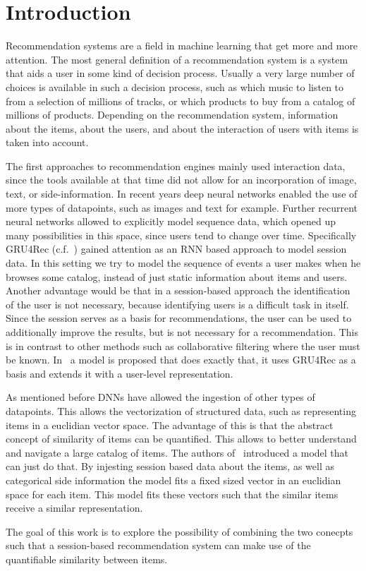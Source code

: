 \chapter{Introduction}
Recommendation systems are a field in machine learning that get more and more attention.
The most general definition of a recommendation system is a system that aids a user in some kind of decision process.
Usually a very large number of choices is available in such a decision process, such as which music to listen to from a selection of millions of tracks, or which products to buy from a catalog of millions of products.
Depending on the recommendation system, information about the items, about the users, and about the interaction of users with items is taken into account.
\par
The first approaches to recommendation engines mainly used interaction data, since the tools available at that time did not allow for an incorporation of image, text, or side-information.
In recent years deep neural networks enabled the use of more types of datapoints, such as images and text for example.
Further recurrent neural networks allowed to explicitly model sequence data, which opened up many possibilities in this space, since users tend to change over time.
Specifically GRU4Rec (c.f.~\cite{gru4rec}) gained attention as an RNN based approach to model session data.
In this setting we try to model the sequence of events a user makes when he browses some catalog, instead of just static information about items and users.
Another advantage would be that in a session-based approach the identification of the user is not necessary, because identifying users is a difficult task in itself.
Since the session serves as a basis for recommendations, the user can be used to additionally improve the results, but is not necessary for a recommendation.
This is in contrast to other methods such as collaborative filtering where the user must be known.
In~\cite{hierarchical} a model is proposed that does exactly that, it uses GRU4Rec as a basis and extends it with a user-level representation.
\par
As mentioned before DNNs have allowed the ingestion of other types of datapoints.
This allows the vectorization of structured data, such as representing items in a euclidian vector space.
The advantage of this is that the abstract concept of similarity of items can be quantified.
This allows to better understand and navigate a large catalog of items.
The authors of~\cite{meta_prod2vec} introduced a model that can just do that.
By injesting session based data about the items, as well as categorical side information the model fits a fixed sized vector in an euclidian space for each item.
This model fits these vectors such that the similar items receive a similar representation.
\par
The goal of this work is to explore the possibility of combining the two conecpts such that a session-based recommendation system can make use of the quantifiable similarity between items.